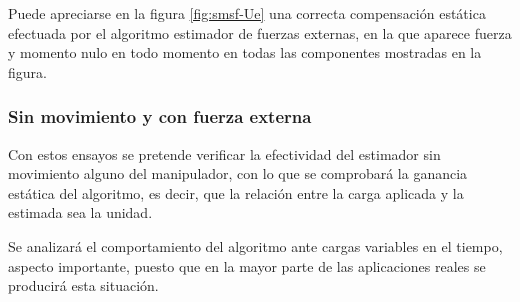 Puede apreciarse en la figura \ref{fig:smsf-Ue} una correcta compensación estática efectuada por el algoritmo estimador de fuerzas externas, en la que aparece fuerza y momento nulo en todo momento en todas las componentes mostradas en la figura. \par  

\subsubsection{Sin movimiento y con fuerza externa}

Con estos ensayos se pretende verificar la efectividad del estimador sin movimiento alguno del manipulador, con lo que se comprobará la ganancia estática del algoritmo, es decir, que la relación entre la carga aplicada y la estimada sea la unidad. \par 

Se analizará el comportamiento del algoritmo ante cargas variables en el tiempo, aspecto importante, puesto que en la mayor parte de las aplicaciones reales se producirá esta situación. \par 

